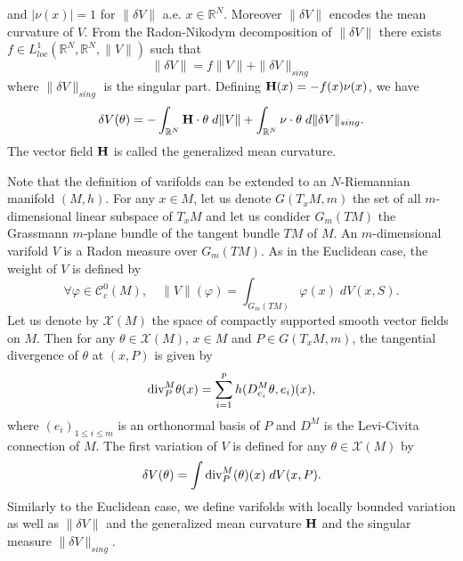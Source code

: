 \documentclass[12pt,english]{smfart} %
\theoremstyle{remark}
\newcommand{\R}{\mathbb{R}}
\newcommand{\spt}{\mathrm{spt}}
\newcommand{\Cc}{\mathcal{C}}
\newcommand{\Hm}{{\bf H}}
\begin{document}
and $|\nu(x)|=1$ for $\|\delta V\|$ a.e. $x\in\R^N$. %
Moreover $\|\delta V\|$ encodes the mean curvature of $V$. From the Radon-Nikodym decomposition of $\|\delta V\|$ there exists $f\in L^1_{loc}(\R^N,\R^N,\|V\|)$ such that 
$$\|\delta V\|=f\|V\|+\|\delta V\|_{sing}$$
where $\|\delta V\|_{sing}$ is the singular part. Defining $\Hm(x)=-f(x)\nu(x)$, we have 
$$\delta V(\theta)=-\int_{\R^N}\Hm\cdot\theta \; d\|V\|+\int_{\R^N}\nu\cdot\theta \; d\|\delta V\|_{sing}.$$
The vector field $\Hm$ is called the generalized mean curvature.  

Note that the definition of varifolds can be extended to an $N$-Riemannian manifold $(M,h)$. For any $x\in M$, let us denote $G(T_xM,m)$ the set of all $m$-dimensional linear subspace of $T_xM$ and let us condider $G_m(TM)$ the Grassmann $m$-plane bundle of the tangent bundle $TM$ of $M$. An $m$-dimensional varifold $V$ is a Radon measure over $G_m(TM)$. As in the Euclidean case, the weight of $V$ is defined by 
$$\forall \varphi \in \Cc^0_c(M), \quad \|V\|(\varphi)=\int_{G_m(TM)} \varphi(x) \;dV(x,S).$$
Let us denote by $\mathcal{X}(M)$ the space of compactly supported smooth vector fields on $M$. Then for any $\theta\in\mathcal{X}(M)$, $x\in M$ and $P\in G(T_xM,m)$, the tangential divergence of $\theta$ at $(x,P)$ is given by
$${\rm div}^M_P\theta(x)=\sum_{i=1}^ph(D^M_{e_i}\theta, e_i)(x),$$
where $(e_i)_{1\leqslant i\leqslant m}$ is an orthonormal basis of $P$ and $D^M$ is the Levi-Civita connection of $M$. The first variation  of $V$ is defined for any $\theta\in\mathcal{X}(M)$ by
$$\delta V(\theta) = \int  {\rm div}^M_P( \theta)(x) \;d V(x,P).$$
Similarly to the Euclidean case, we define varifolds with locally bounded variation as well as $\|\delta V\|$ and the generalized mean curvature $\Hm$ and the singular measure $\|\delta V\|_{sing}$.


\end{document}

